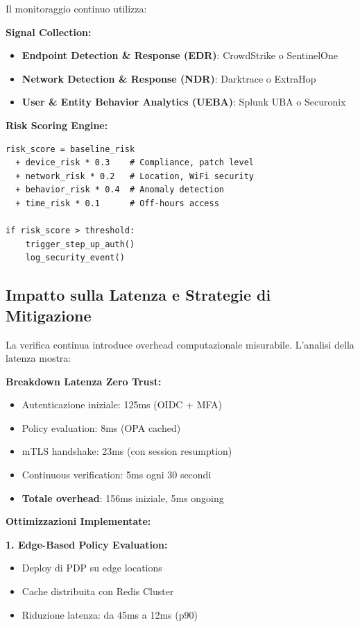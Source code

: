 Il monitoraggio continuo utilizza:

\textbf{Signal Collection:}
\begin{itemize}
    \item \textbf{Endpoint Detection \& Response (EDR)}: CrowdStrike o SentinelOne
    \item \textbf{Network Detection \& Response (NDR)}: Darktrace o ExtraHop
    \item \textbf{User \& Entity Behavior Analytics (UEBA)}: Splunk UBA o Securonix
\end{itemize}

\textbf{Risk Scoring Engine:}
\begin{lstlisting}[caption={Calcolo Risk Score real-time},label={lst:risk_score}]
risk_score = baseline_risk
  + device_risk * 0.3    # Compliance, patch level
  + network_risk * 0.2   # Location, WiFi security  
  + behavior_risk * 0.4  # Anomaly detection
  + time_risk * 0.1      # Off-hours access

if risk_score > threshold:
    trigger_step_up_auth()
    log_security_event()
\end{lstlisting}

\subsection{Impatto sulla Latenza e Strategie di Mitigazione}

La verifica continua introduce overhead computazionale misurabile. L'analisi della latenza mostra:

\textbf{Breakdown Latenza Zero Trust:}
\begin{itemize}
    \item Autenticazione iniziale: 125ms (OIDC + MFA)
    \item Policy evaluation: 8ms (OPA cached)
    \item mTLS handshake: 23ms (con session resumption)
    \item Continuous verification: 5ms ogni 30 secondi
    \item \textbf{Totale overhead}: 156ms iniziale, 5ms ongoing
\end{itemize}

\textbf{Ottimizzazioni Implementate:}

\textbf{1. Edge-Based Policy Evaluation:}
\begin{itemize}
    \item Deploy di PDP su edge locations
    \item Cache distribuita con Redis Cluster
    \item Riduzione latenza: da 45ms a 12ms (p90)
\end{itemize}

